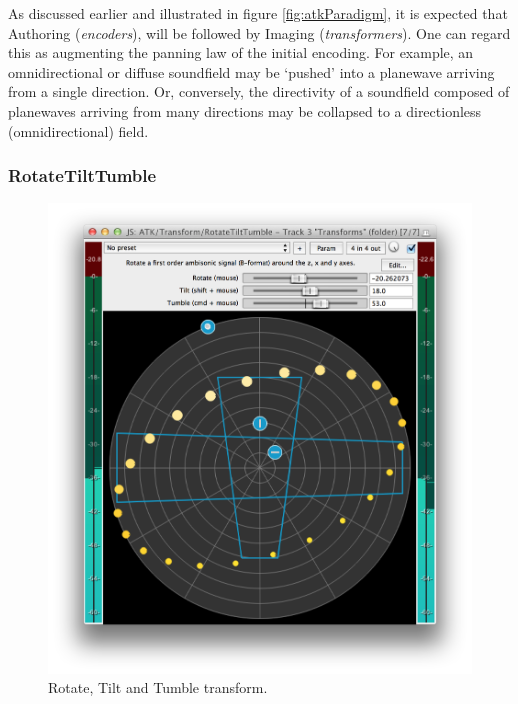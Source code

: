 \documentclass{article}
\begin{document}
As discussed earlier and illustrated in figure \ref{fig:atkParadigm}, it is expected that Authoring (\emph{encoders}), will be followed by Imaging (\emph{transformers}).
One can regard this as augmenting the panning law of the initial encoding. For example, an omni\-directional or diffuse soundfield may be `pushed' into a planewave arriving from a single direction.
Or, conversely, the directivity of a soundfield composed of planewaves arriving from many directions may be collapsed to a direct\-ionless (omnidirectional) field.



%



\subsubsection{RotateTiltTumble}\label{sec:rotate}

\begin{figure}[h]
\captionsetup{aboveskip=-6pt}
\centering
\includegraphics[width=0.8\columnwidth]{figures/rotateTiltTumble.png}
\setlength{\abovecaptionskip}{0pt plus 3pt minus 2pt} %
\caption{Rotate, Tilt and Tumble transform.\label{fig:rotateTransform}}
\end{figure}
\end{document}
